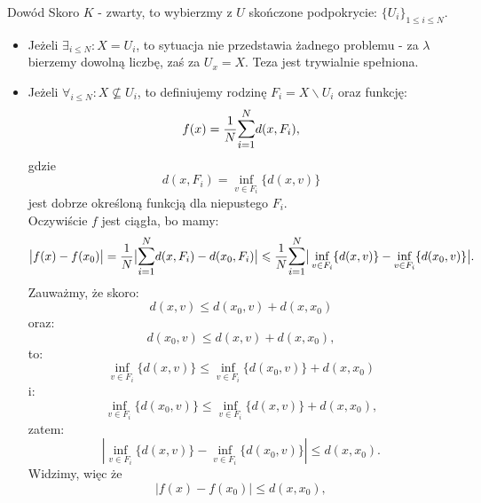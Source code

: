 \documentclass{article}
\newcounter{defi}
\numberwithin{defi}{section}
\numberwithin{defi}{section}
\newcommand{\se}{\subseteq}
\renewcommand{\leq}{\leqslant}
\newcommand{\bsum}[2]{\mathlarger{\sum_{#1}^{#2}}}
\begin{document}
\begin{dow}{Dowód}
    Skoro $K$ - zwarty, to wybierzmy z $U$ skończone podpokrycie: $\{U_i\}_{1 \leq i \leq N}$. 
    \begin{itemize}
        \item Jeżeli $\exists_{i\leq N}: X = U_i$, to sytuacja nie przedstawia żadnego problemu - za $\lambda$ bierzemy dowolną liczbę, zaś za $U_x = X$. Teza jest trywialnie spełniona.

        \item Jeżeli $\forall_{i \leq N}: X \not \se U_i$, to definiujemy rodzinę $F_i = X \backslash U_i$ oraz funkcję: \begin{equation*}
            f(x) = \frac{1}{N} \bsum{i = 1}{N}d(x, F_i),
        \end{equation*} gdzie \begin{equation*}
            d(x, F_i) = \inf_{v \in F_i}\{d(x, v)\}
        \end{equation*} jest dobrze określoną funkcją dla niepustego $F_i$.\\
        Oczywiście $f$ jest ciągła, bo mamy: \begin{equation*}
            \big| f(x) - f(x_0)\big| = \frac{1}{N} \big|\bsum{i = 1}{N} d(x, F_i) - d(x_0, F_i) \big| \leq \frac{1}{N} \bsum{i = 1}{N} \big| \inf_{v \in F_i}\{d(x, v)\} - \inf_{v \in F_i}\{d(x_0, v) \}\big|.
        \end{equation*} Zauważmy, że skoro: \begin{equation*}
            d(x, v)  \leq d(x_0, v) + d(x, x_0) 
        \end{equation*} oraz: \begin{equation*}
            d(x_0, v) \leq d(x, v) + d(x, x_0),
        \end{equation*} to: \begin{equation*}
            \inf_{v \in F_i}\{d(x, v)\} \leq \inf_{v \in F_i}\{d(x_0, v) \} + d(x, x_0)
        \end{equation*} i: \begin{equation*}
            \inf_{v \in F_i}\{d(x_0, v)\} \leq \inf_{v \in F_i}\{d(x, v) \} + d(x, x_0),
        \end{equation*} zatem: \begin{equation*}
            |\inf_{v \in F_i}\{d(x, v)\} - \inf_{v \in F_i}\{d(x_0, v) \}| \leq d(x, x_0).
        \end{equation*} Widzimy, więc że \begin{equation*}
            |f(x) - f(x_0)| \leq d(x, x_0),

\end{equation*}
\end{itemize}
\end{dow}
\end{document}
